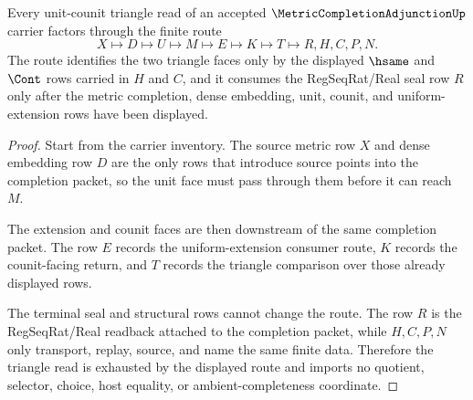 \begin{theorem}
\label{thm:metric-completion-adjunction-unit-counit-triangle}
Every unit-counit triangle read of an accepted $\MetricCompletionAdjunctionUp$ carrier factors through the finite route
$$
X \longmapsto D \longmapsto U \longmapsto M \longmapsto E \longmapsto K \longmapsto T \longmapsto R,H,C,P,N .
$$
The route identifies the two triangle faces only by the displayed $\hsame$ and $\Cont$ rows carried in $H$ and $C$, and it consumes the RegSeqRat/Real seal row $R$ only after the metric completion, dense embedding, unit, counit, and uniform-extension rows have been displayed.
\end{theorem}
\begin{proof}
Start from the carrier inventory. The source metric row $X$ and dense embedding row $D$ are the only rows that introduce source points into the completion packet, so the unit face must pass through them before it can reach $M$.

The extension and counit faces are then downstream of the same completion packet. The row $E$ records the uniform-extension consumer route, $K$ records the counit-facing return, and $T$ records the triangle comparison over those already displayed rows.

The terminal seal and structural rows cannot change the route. The row $R$ is the RegSeqRat/Real readback attached to the completion packet, while $H,C,P,N$ only transport, replay, source, and name the same finite data. Therefore the triangle read is exhausted by the displayed route and imports no quotient, selector, choice, host equality, or ambient-completeness coordinate.
\end{proof}


